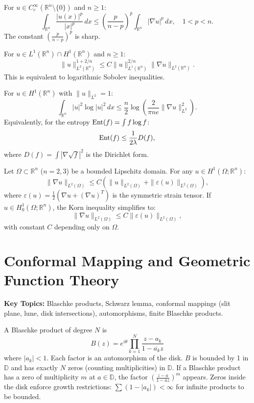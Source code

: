 \begin{example}
For $u \in C_c^\infty(\mathbb{R}^n \setminus \{0\})$ and $n \geq 1$:
\[
\int_{\mathbb{R}^n} \frac{|u(x)|^p}{|x|^p} \,dx \leq \left(\frac{p}{n-p}\right)^p
\int_{\mathbb{R}^n} |\nabla u|^p \,dx, \quad 1 < p < n.
\]
The constant $\left(\frac{p}{n-p}\right)^p$ is sharp.
\end{example}

\begin{example}
For $u \in L^1(\mathbb{R}^n) \cap H^1(\mathbb{R}^n)$ and $n \geq 1$:
\[
\|u\|_{L^2(\mathbb{R}^n)}^{1+2/n} \leq C \|u\|_{L^1(\mathbb{R}^n)}^{2/n} \|\nabla u\|_{L^2(\mathbb{R}^n)}.
\]
This is equivalent to logarithmic Sobolev inequalities.
\end{example}

\begin{example}
For $u \in H^1(\mathbb{R}^n)$ with $\|u\|_{L^2} = 1$:
\[
\int_{\mathbb{R}^n} |u|^2 \log|u|^2 \,dx \leq \frac{n}{2} \log\left( \frac{2}{\pi n e} \|\nabla u\|_{L^2}^2 \right).
\]
Equivalently, for the entropy $\operatorname{Ent}(f) = \int f \log f$:
\[
\operatorname{Ent}(f) \leq \frac{1}{2\lambda} D(f),
\]
where $D(f) = \int |\nabla \sqrt{f}|^2$ is the Dirichlet form.
\end{example}

\begin{example}
Let $\Omega \subset \mathbb{R}^n$ ($n=2,3$) be a bounded Lipschitz domain.
For any $u \in H^1(\Omega; \mathbb{R}^n)$:
\[
\|\nabla u\|_{L^2(\Omega)} \leq C \left( \|u\|_{L^2(\Omega)} + \|\varepsilon(u)\|_{L^2(\Omega)} \right),
\]
where $\varepsilon(u) = \frac{1}{2}(\nabla u + (\nabla u)^T)$ is the symmetric strain tensor.
If $u \in H_0^1(\Omega; \mathbb{R}^n)$, the Korn inequality simplifies to:
\[
\|\nabla u\|_{L^2(\Omega)} \leq C \|\varepsilon(u)\|_{L^2(\Omega)},
\]
with constant $C$ depending only on $\Omega$.
\end{example}

\section{Conformal Mapping and Geometric Function Theory}

\textbf{Key Topics:} Blaschke products, Schwarz lemma, conformal mappings (slit plane, lune, disk intersections), automorphisms, finite Blaschke products.

\begin{example}
A Blaschke product of degree $N$ is
\[ B(z) = e^{i\theta} \prod_{k=1}^N \frac{z - a_k}{1 - \overline{a_k}z} \]
where $|a_k| < 1$. Each factor is an automorphism of the disk. $B$ is bounded by 1 in $\mathbb{D}$ and has exactly $N$ zeros (counting multiplicities) in $\mathbb{D}$. If a Blaschke product has a zero of multiplicity $m$ at $a \in \mathbb{D}$, the factor $\left(\frac{z-a}{1-\bar{a}z}\right)^m$ appears. Zeros inside the disk enforce growth restrictions: $\sum (1 - |a_k|) < \infty$ for infinite products to be bounded.
\end{example}

